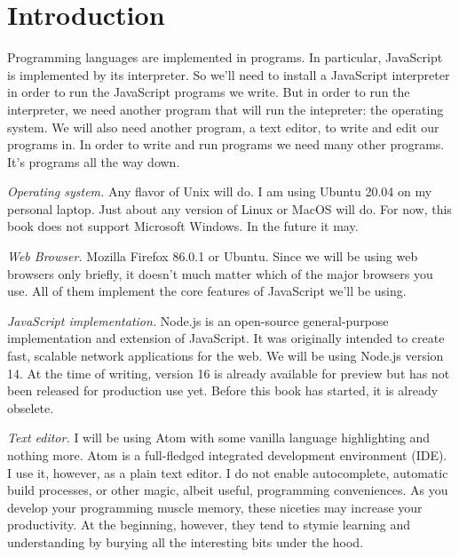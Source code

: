 \chapter{\label{chapter:intro} Introduction}

Programming languages are implemented in programs. In particular, JavaScript is implemented by its interpreter. So we'll need to install a JavaScript interpreter in order to run the JavaScript programs we write. But in order to run the interpreter, we need another program that will run the intepreter: the operating system. We will also need another program, a text editor, to write and edit our programs in. In order to write and run programs we need many other programs. It's programs all the way down.

\textit{Operating system.} Any flavor of Unix will do. I am using Ubuntu 20.04 on my personal laptop. Just about any version of Linux or MacOS will do. For now, this book does not support Microsoft Windows. In the future it may.

\textit{Web Browser.} Mozilla Firefox 86.0.1 or Ubuntu. Since we will be using web browsers only briefly, it doesn't much matter which of the major browsers you use. All of them implement the core features of JavaScript we'll be using.

\textit{JavaScript implementation.} Node.js is an open-source general-purpose implementation and extension of JavaScript. It was originally intended to create fast, scalable network applications for the web. We will be using Node.js version 14. At the time of writing, version 16 is already available for preview but has not been released for production use yet. Before this book has started, it is already obselete.

\textit{Text editor.} I will be using Atom with some vanilla language highlighting and nothing more. Atom is a full-fledged integrated development environment (IDE). I use it, however, as a plain text editor. I do not enable autocomplete, automatic build processes, or other magic, albeit useful, programming conveniences. As you develop your programming muscle memory, these niceties may increase your productivity. At the beginning, however, they tend to stymie learning and understanding by burying all the interesting bits under the hood.

